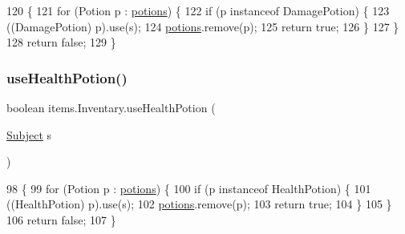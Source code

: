 \begin{DoxyCode}
120                                               \{
121         \textcolor{keywordflow}{for} (Potion p : \mbox{\hyperlink{classitems_1_1_inventary_afa542455e08a2cc05377133889b7b091}{potions}}) \{
122             \textcolor{keywordflow}{if} (p instanceof DamagePotion) \{
123                 ((DamagePotion) p).use(s);
124                 \mbox{\hyperlink{classitems_1_1_inventary_afa542455e08a2cc05377133889b7b091}{potions}}.remove(p);
125                 \textcolor{keywordflow}{return} \textcolor{keyword}{true};
126             \}
127         \}
128         \textcolor{keywordflow}{return} \textcolor{keyword}{false};
129     \}
\end{DoxyCode}
\mbox{\label{classitems_1_1_inventary_a16f2878bacc73497112aaadb1befef1c}} 
\subsubsection{\texorpdfstring{use\+Health\+Potion()}{useHealthPotion()}}
{\footnotesize\ttfamily boolean items.\+Inventary.\+use\+Health\+Potion (\begin{DoxyParamCaption}\item[{\mbox{\hyperlink{classentities_1_1_subject}{Subject}}}]{s }\end{DoxyParamCaption})\hspace{0.3cm}{\ttfamily [inline]}}


\begin{DoxyCode}
98                                               \{
99         \textcolor{keywordflow}{for} (Potion p : \mbox{\hyperlink{classitems_1_1_inventary_afa542455e08a2cc05377133889b7b091}{potions}}) \{
100             \textcolor{keywordflow}{if} (p instanceof HealthPotion) \{
101                 ((HealthPotion) p).use(s);
102                 \mbox{\hyperlink{classitems_1_1_inventary_afa542455e08a2cc05377133889b7b091}{potions}}.remove(p);
103                 \textcolor{keywordflow}{return} \textcolor{keyword}{true};
104             \}
105         \}
106         \textcolor{keywordflow}{return} \textcolor{keyword}{false};
107     \}
\end{DoxyCode}
\mbox{\label{classitems_1_1_inventary_a0465268c54df439b77684c86a07d3049}} 
